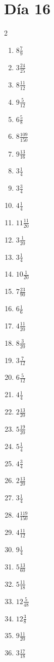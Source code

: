 \documentclass[12pt]{article}
\begin{document}
\section*{Día 16}
\begin{multicols}{2}\begin{enumerate}
\item $ 8 \frac{7}{9} $
\item $ 3 \frac{24}{25} $
\item $ 8 \frac{11}{12} $
\item $ 9 \frac{5}{12} $
\item $ 6 \frac{5}{8} $
\item $ 8 \frac{109}{150} $
\item $ 9 \frac{13}{16} $
\item $ 3 \frac{1}{4} $
\item $ 3 \frac{3}{4} $
\item $ 4 \frac{1}{4} $
\item $ 11 \frac{11}{20} $
\item $ 3 \frac{1}{20} $
\item $ 3 \frac{1}{4} $
\item $ 10 \frac{1}{20} $
\item $ 7 \frac{23}{90} $
\item $ 6 \frac{1}{6} $
\item $ 4 \frac{11}{20} $
\item $ 8 \frac{3}{20} $
\item $ 3 \frac{7}{12} $
\item $ 6 \frac{5}{12} $
\item $ 4 \frac{1}{4} $
\item $ 2 \frac{13}{20} $
\item $ 5 \frac{19}{20} $
\item $ 5 \frac{1}{4} $
\item $ 4 \frac{3}{4} $
\item $ 2 \frac{13}{20} $
\item $ 3 \frac{1}{4} $
\item $ 4 \frac{119}{150} $
\item $ 4 \frac{11}{12} $
\item $ 9 \frac{1}{4} $
\item $ 5 \frac{13}{60} $
\item $ 5 \frac{11}{18} $
\item $ 12 \frac{5}{48} $
\item $ 12 \frac{3}{8} $
\item $ 9 \frac{11}{20} $
\item $ 3 \frac{17}{18} $

\end{enumerate}
\end{multicols}
\end{document}
